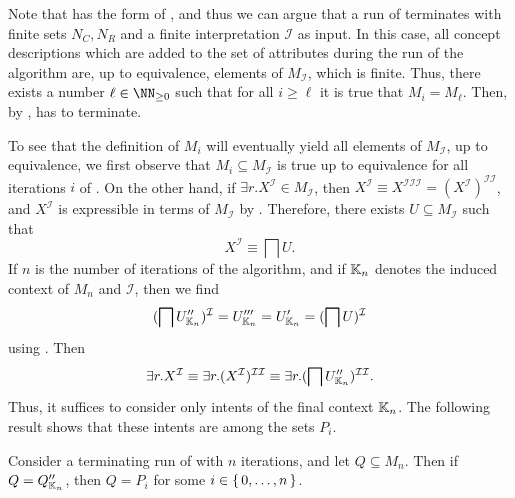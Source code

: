 Note that  has the form of
, and thus we can argue that a run of
 terminates with finite sets $N_{C}, N_{R}$ and a finite
interpretation $\mathcal{I}$ as input.  In this case, all concept descriptions which are
added to the set of attributes during the run of the algorithm are, up to equivalence,
elements of $M_{\mathcal{I}}$, which is finite.  Thus, there exists a number $\ell \in
\NN_{\ge 0}$ such that for all $i \geq \ell$ it is true that $M_{i} = M_{\ell}$.  Then, by
,  has to
terminate.

To see that the definition of $M_{i}$ will eventually yield all elements of
$M_{\mathcal{I}}$, up to equivalence, we first observe that $M_{i} \subseteq
M_{\mathcal{I}}$ is true up to equivalence for all iterations $i$ of
.  On the other hand, if $\exists r. X^{\mathcal{I}} \in
M_{\mathcal{I}}$, then $X^{\mathcal{I}} \equiv X^{\mathcal{I}\mathcal{I}\mathcal{I}} =
(X^{\mathcal{I}})^{\mathcal{I}\mathcal{I}}$, and $X^{\mathcal{I}}$ is expressible in terms
of $M_{\mathcal{I}}$ by .  Therefore, there
exists $U \subseteq M_{\mathcal{I}}$ such that
\begin{equation*}
  X^{\mathcal{I}} \equiv \bigsqcap U.
\end{equation*}
If $n$ is the number of iterations of the algorithm, and if ${\mathbb{K}}_{n}$ denotes the
induced context of $M_{n}$ and $\mathcal{I}$, then we find
\begin{equation*}
  (\bigsqcap U_{{\mathbb{K}}_{n}}'')^{\mathcal{I}} = U_{{\mathbb{K}}_{n}}''' = U_{{\mathbb{K}}_{n}}' =
  (\bigsqcap U)^{\mathcal{I}}
\end{equation*}
using .  Then
\begin{equation*}
  \exists r. X^{\mathcal{I}} \equiv \exists r. (X^{\mathcal{I}})^{\mathcal{I}\mathcal{I}}
  \equiv \exists r.(\bigsqcap U_{{\mathbb{K}}_{n}}'')^{\mathcal{I}\mathcal{I}}.
\end{equation*}
Thus, it suffices to consider only intents of the final context ${\mathbb{K}}_{n}$.  The
following result shows that these intents are among the sets $P_{i}$.

\begin{Lemma}
  \label{lem:Felix-6.3}
  Consider a terminating run of  with $n$ iterations, and
  let $Q \subseteq M_{n}$.  Then if $Q = Q_{{\mathbb{K}}_{n}}''$, then $Q = P_{i}$ for some $i
  \in {\ensuremath{\{\, 0, \dots, n \,\}}}$.
\end{Lemma}

